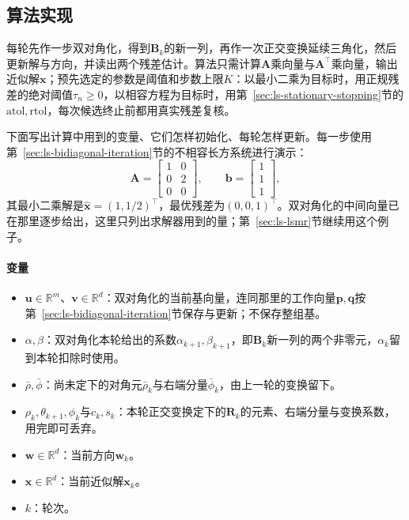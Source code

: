 \subsection{算法实现}

每轮先作一步双对角化，得到$\bm B_k$的新一列，再作一次正交变换延续三角化，然后更新解与方向，并读出两个残差估计。算法只需计算$\bm A$乘向量与$\bm A^\top$乘向量，输出近似解$\bm x$；预先选定的参数是阈值和步数上限$K$：以最小二乘为目标时，用正规残差的绝对阈值$\tau_n\ge0$，以相容方程为目标时，用第~\ref{sec:ls-stationary-stopping}节的$\mathrm{atol},\mathrm{rtol}$，每次候选终止前都用真实残差复核。

下面写出计算中用到的变量、它们怎样初始化、每轮怎样更新。每一步使用第~\ref{sec:ls-bidiagonal-iteration}节的不相容长方系统进行演示：
\[
 \bm A=\begin{bmatrix}1&0\\0&2\\0&0\end{bmatrix},\qquad
 \bm b=\begin{bmatrix}1\\1\\1\end{bmatrix},
\]
其最小二乘解是$\hat{\bm x}=(1,1/2)^\top$，最优残差为$(0,0,1)^\top$。双对角化的中间向量已在那里逐步给出，这里只列出求解器用到的量；第~\ref{sec:ls-lsmr}节继续用这个例子。

\paragraph{变量}
\begin{itemize}
 \item $\bm u\in\mathbb R^m$、$\bm v\in\mathbb R^d$：双对角化的当前基向量，连同那里的工作向量$\bm p,\bm q$按第~\ref{sec:ls-bidiagonal-iteration}节保存与更新；不保存整组基。
 \item $\alpha,\beta$：双对角化本轮给出的系数$\alpha_{k+1},\beta_{k+1}$，即$\bm B_k$新一列的两个非零元，$\alpha_k$留到本轮扣除时使用。
 \item $\bar\rho,\bar\phi$：尚未定下的对角元$\bar\rho_k$与右端分量$\bar\phi_k$，由上一轮的变换留下。
 \item $\rho_k,\theta_{k+1},\phi_k$与$c_k,s_k$：本轮正交变换定下的$\bm R_k$的元素、右端分量与变换系数，用完即可丢弃。
 \item $\bm w\in\mathbb R^d$：当前方向$\bm w_k$。
 \item $\bm x\in\mathbb R^d$：当前近似解$\bm x_k$。
 \item $k$：轮次。
\end{itemize}

